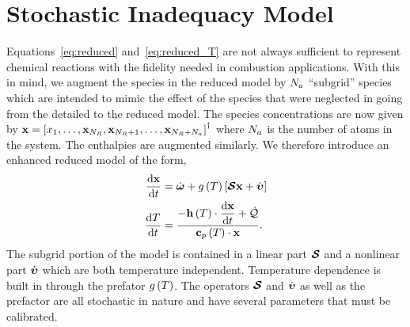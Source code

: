\section{Stochastic Inadequacy Model}
Equations~\eqref{eq:reduced} and~\eqref{eq:reduced_T} are not always sufficient to represent chemical reactions with the fidelity needed in combustion applications.  With this in mind, we augment the species in the reduced model by $N_{a}$ ``subgrid'' species which are intended to mimic the effect of the species that were neglected in going from the detailed to the reduced model.  The species concentrations are now given by $\mathbf{x} = \left[x_{1}, \ldots, \mathbf{x}_{N_{R}}, \mathbf{x}_{N_{R}+1}, \ldots, \mathbf{x}_{N_{R} + N_{a}}\right]^{\dagger}$ where $N_{a}$ is the number of atoms in the system.  The enthalpies are augmented similarly.  We therefore introduce an enhanced reduced model of the form,
\begin{align}
  \frac{\mathrm{d} \mathbf{x}}{\mathrm{d} t} &= \dot{\boldsymbol{\omega}} + g\left(T\right)\left[\boldsymbol{\mathcal{S}} \mathbf{x} + \dot{\boldsymbol{\upsilon}}\right] \\
  \frac{\mathrm{d} T}{\mathrm{d} t}  &= \frac{-\displaystyle \mathbf{h}\left(T\right)\cdot\frac{\mathrm{d} \mathbf{x}}{\mathrm{d} t} + \dot{\mathcal{Q}}}{\displaystyle \mathbf{c}_{p}\left(T\right)\cdot\mathbf{x}}.
\end{align}
The subgrid portion of the model is contained in a linear part $\boldsymbol{\mathcal{S}}$ and a nonlinear part $\dot{\boldsymbol{\upsilon}}$ which are both temperature independent.  Temperature dependence is built in through the prefator $g\left(T\right)$.  The operators $\boldsymbol{\mathcal{S}}$ and $\dot{\boldsymbol{\upsilon}}$ as well as the prefactor are all stochastic in nature and have several parameters that must be calibrated.
